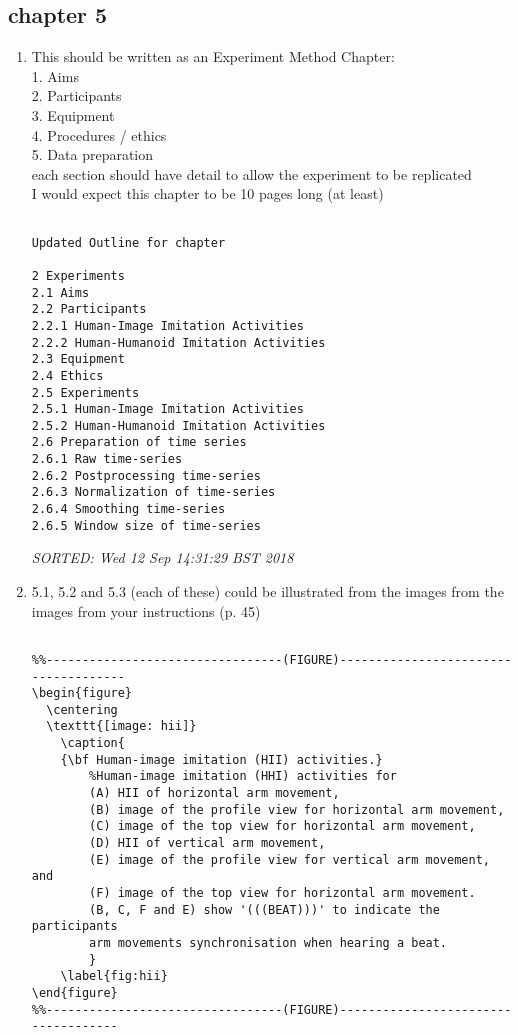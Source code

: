 \documentclass[10pt]{article}
\begin{document}
\subsection{chapter 5}


\begin{enumerate}[noitemsep,topsep=0pt]
\item This should be written as an Experiment Method Chapter: \\
	1. Aims \\
	2. Participants \\
	3. Equipment \\
	4. Procedures / ethics \\
	5. Data preparation \\
		each section should have detail
		to allow the experiment to be replicated 
		\\
	I would expect this chapter to be 10 pages long (at least)


\begin{verbatim}

Updated Outline for chapter

2 Experiments
2.1 Aims 
2.2 Participants 
2.2.1 Human-Image Imitation Activities 
2.2.2 Human-Humanoid Imitation Activities
2.3 Equipment
2.4 Ethics 
2.5 Experiments 
2.5.1 Human-Image Imitation Activities 
2.5.2 Human-Humanoid Imitation Activities 
2.6 Preparation of time series 
2.6.1 Raw time-series 
2.6.2 Postprocessing time-series 
2.6.3 Normalization of time-series 
2.6.4 Smoothing time-series 
2.6.5 Window size of time-series 

\end{verbatim}
\textit{
SORTED: 
Wed 12 Sep 14:31:29 BST 2018
}
\\




\item 5.1, 5.2 and 5.3 (each of these) could be illustrated from the images
	from the images from your instructions (p. 45)


\begin{verbatim}

%%---------------------------------(FIGURE)-------------------------------------
\begin{figure}
  \centering
  \texttt{[image: hii]}
    \caption{
	{\bf Human-image imitation (HII) activities.} 
		%Human-image imitation (HHI) activities for 
		(A) HII of horizontal arm movement, 
		(B) image of the profile view for horizontal arm movement,
		(C) image of the top view for horizontal arm movement,
		(D) HII of vertical arm movement, 
		(E) image of the profile view for vertical arm movement, and
		(F) image of the top view for horizontal arm movement.
		(B, C, F and E) show '(((BEAT)))' to indicate the participants
		arm movements synchronisation when hearing a beat.
        }
    \label{fig:hii}
\end{figure}
%%---------------------------------(FIGURE)------------------------------------


\end{verbatim}
\end{enumerate}
\end{document}
